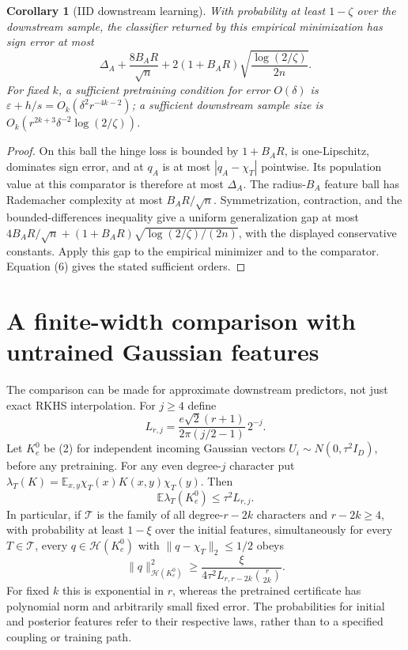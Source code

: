 \documentclass[11pt]{article}
\newtheorem{corollary}[theorem]{Corollary}
\newcommand{\E}{\mathbb E}\newcommand{\R}{\mathbb R}
\begin{document}
\begin{corollary}[IID downstream learning]
With probability at least $1-\zeta$ over the downstream sample, the
classifier returned by this empirical minimization has sign error at most
\[
 \Delta_A+\frac{8B_AR}{\sqrt n}
                   +2(1+B_AR)\sqrt{\frac{\log(2/\zeta)}{2n}}.
 \tag{12}
\]
For fixed $k$, a sufficient pretraining condition for error $O(\delta)$
is $\varepsilon+h/s=O_k(\delta^2r^{-4k-2})$; a sufficient downstream
sample size is $O_k(r^{2k+3}\delta^{-2}\log(2/\zeta))$.
\end{corollary}
\begin{proof}
On this ball the hinge loss is bounded by $1+B_AR$, is one-Lipschitz, dominates sign
error, and at $q_A$ is at most $|q_A-\chi_T|$ pointwise. Its population
value at this comparator is therefore at most $\Delta_A$.
The radius-$B_A$ feature ball has Rademacher complexity at most
$B_AR/\sqrt n$. Symmetrization, contraction, and the bounded-differences
inequality give a uniform generalization gap at most
$4B_AR/\sqrt n+(1+B_AR)\sqrt{\log(2/\zeta)/(2n)}$, with the displayed
conservative constants. Apply this gap to the empirical minimizer and
to the comparator. Equation (6) gives the stated sufficient orders.
\end{proof}



\section{A finite-width comparison with untrained Gaussian features}
The comparison can be made for approximate downstream predictors,
not just exact RKHS interpolation. For $j\ge4$ define
\[
 L_{r,j}=\frac{e\sqrt2(r+1)}{2\pi(j/2-1)}\,2^{-j}.
\]
Let $K_e^0$ be (2) for independent incoming Gaussian vectors
$U_i\sim N(0,\tau^2I_D)$, before any pretraining. For any even degree-$j$
character put
$\lambda_T(K)=\E_{x,y}\chi_T(x)K(x,y)\chi_T(y)$.
Then
\[
                   \E\lambda_T(K_e^0)\le\tau^2 L_{r,j}. \tag{21}
\]
In particular, if $\mathcal T$ is the family of all degree-$r-2k$
characters and $r-2k\ge4$, with probability at least $1-\xi$ over the
initial features, simultaneously for every $T\in\mathcal T$, every
$q\in\mathcal H(K_e^0)$ with $\|q-\chi_T\|_2\le1/2$ obeys
\[
 \|q\|_{\mathcal H(K_e^0)}^2
       \ge\frac{\xi}{4\tau^2L_{r,r-2k}\binom r{2k}}.    \tag{22}
\]
For fixed $k$ this is exponential in $r$, whereas the pretrained
certificate has polynomial norm and arbitrarily small fixed error.
The probabilities for initial and posterior features refer to their
respective laws, rather than to a specified coupling or training path.
\end{document}
